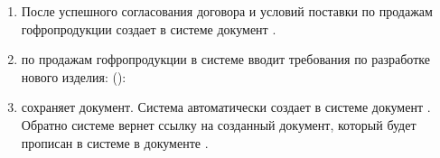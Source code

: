 \begin{enumerate}
\item	После успешного согласования договора и условий поставки \manager по продажам гофропродукции создает в системе \erp документ .

\item \manager по продажам гофропродукции в системе \erp вводит требования по разработке нового изделия: 
():


\item \manager сохраняет документ. Система \erp автоматически создает в системе \gofro документ .
Обратно системе \gofro вернет ссылку на созданный документ, который будет прописан в системе \erp в документе .


\end{enumerate}
